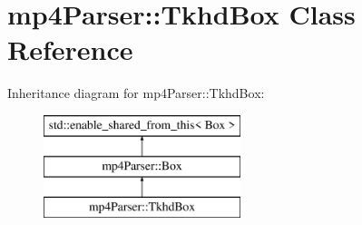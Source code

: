 \hypertarget{classmp4_parser_1_1_tkhd_box}{}\section{mp4\+Parser\+::Tkhd\+Box Class Reference}
\label{classmp4_parser_1_1_tkhd_box}
Inheritance diagram for mp4\+Parser\+::Tkhd\+Box\+:\begin{figure}[H]
\begin{center}
\leavevmode
\includegraphics[height=3.000000cm]{classmp4_parser_1_1_tkhd_box}
\end{center}
\end{figure}
